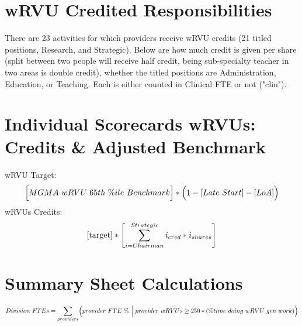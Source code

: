 \documentclass{article}
\begin{document}

	\section{wRVU Credited Responsibilities} %
		There are 23 activities for which providers receive wRVU credits (21 titled positions, Research, and Strategic).  Below are how much credit is given per share (split between two people will receive half credit, being sub-specialty teacher in two areas is double credit), whether the titled positions are Administration, Education, or Teaching. Each is either counted in Clinical FTE or not ("clin").
		

	\section{Individual Scorecards wRVUs: Credits \& Adjusted Benchmark} %
		wRVU Target:
		\begin{equation}\label{target}
			\Bigl[ MGMA \ wRVU \ 65th \ \%ile \ Benchmark \Bigr]* \Bigl( 1 - [Late \ Start] - [LoA]\Bigr) 
		\end{equation}
		wRVUs Credits:
		\begin{equation*}
			\eqref{target} * \Biggl[ \sum_{i=Chairman}^{Strategic} i_{cred} * i_{shares} \Biggr] 
		\end{equation*}
	
	\section{Summary Sheet Calculations}
		\begin{equation*}
			Division \ FTEs = \sum_{providers} \Bigl(provider \ FTE \ \% \ \Big| \ provider \ wRVUs \ge 250*(\% time \ doing \ wRVU \ gen \ work) \Bigr)
		\end{equation*} 
\end{document}
